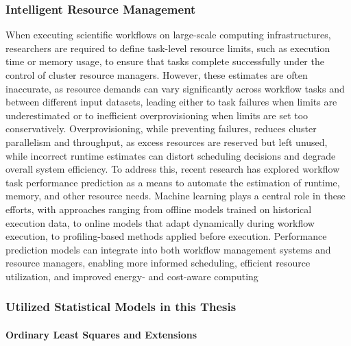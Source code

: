 \subsubsection{Intelligent Resource Management}
\label{sec:background_ml_resourcemanagement}
When executing scientific workflows on large-scale computing infrastructures, researchers are required to define task-level resource limits, such as execution time or memory usage, to ensure that tasks complete successfully under the control of cluster resource managers. However, these estimates are often inaccurate, as resource demands can vary significantly across workflow tasks and between different input datasets, leading either to task failures when limits are underestimated or to inefficient overprovisioning when limits are set too conservatively. Overprovisioning, while preventing failures, reduces cluster parallelism and throughput, as excess resources are reserved but left unused, while incorrect runtime estimates can distort scheduling decisions and degrade overall system efficiency. To address this, recent research has explored workflow task performance prediction as a means to automate the estimation of runtime, memory, and other resource needs. Machine learning plays a central role in these efforts, with approaches ranging from offline models trained on historical execution data, to online models that adapt dynamically during workflow execution, to profiling-based methods applied before execution. Performance prediction models can integrate into both workflow management systems and resource managers, enabling more informed scheduling, efficient resource utilization, and improved energy- and cost-aware computing %

\subsubsection{Utilized Statistical Models in this Thesis}
\label{sec:background_ml_algorithms}

\paragraph{Ordinary Least Squares and Extensions}
\label{sec:background_ml_lr}
